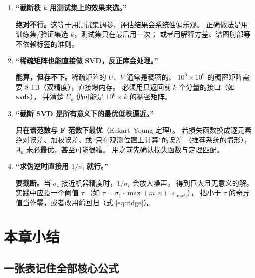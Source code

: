 \documentclass[UTF8, 11pt, a4paper, fontset=windows]{ctexart}
\theoremstyle{cnthm}
\theoremstyle{cndef}
\begin{document}
\begin{enumerate}[leftmargin=2.2em, itemsep=0.9em]
  \item \textbf{“截断秩 $k$ 用测试集上的效果来选。”}

  \textbf{绝对不行。}这等于用测试集调参，评估结果会系统性偏乐观。
  正确做法是用训练集/验证集选 $k$，测试集只在最后用一次；
  或者用解释方差、谱图肘部等不依赖标签的准则。

  \item \textbf{“稀疏矩阵也能直接做 SVD，反正库会处理。”}

  \textbf{能算，但存不下。}稀疏矩阵的 $U$、$V$ 通常是稠密的。
  $10^6\times10^6$ 的稠密矩阵需要 $8$\,TB（双精度），直接爆内存。
  必须用只返回前 $k$ 个分量的接口（如 \texttt{svds}），
  并清楚 $U_k$ 仍可能是 $10^6\times k$ 的稠密矩阵。

  \item \textbf{“截断 SVD 是所有意义下的最优低秩逼近。”}

  \textbf{只在谱范数与 F 范数下最优}（Eckart--Young 定理）。
  若损失函数换成逐元素绝对误差、加权误差、或“只在观测位置上计算”的误差
  （推荐系统的情形），$A_k$ 未必最优，甚至可能很糟。
  用之前先确认损失函数与定理匹配。

  \item \textbf{“求伪逆时直接用 $1/\sigma_i$ 就行。”}

  \textbf{要截断。}当 $\sigma_i$ 接近机器精度时，$1/\sigma_i$ 会放大噪声，
  得到巨大且无意义的解。实践中应设一个阈值 $\tau$
  （如 $\tau=\sigma_1\cdot\max(m,n)\cdot\varepsilon_{\text{mach}}$），
  把小于 $\tau$ 的奇异值当作零，或者改用岭回归（式 \eqref{eq:ridge}）。

\end{enumerate}

\section{本章小结}\label{sec:summary}

\subsection{一张表记住全部核心公式}
\end{document}
